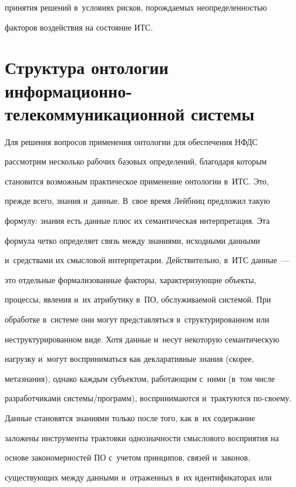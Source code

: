 принятия решений в~условиях рисков, порождаемых неопределенностью


факторов воздействия на состояние ИТС.





\section{Структура онтологии информационно-телекоммуникационной системы}





  Для решения вопросов применения онтологии для обеспечения НФДС


рассмотрим несколько рабочих базовых определений, благодаря которым


становится возможным практическое применение онтологии в~ИТС. Это,


прежде всего, знания и~данные. В~свое время Лейбниц предложил такую


формулу: знания есть данные плюс их семантическая интерпретация. Эта


формула четко определяет связь между знаниями, исходными данными


и~средствами их смысловой интерпретации. Действительно, в~ИТС данные~---


это отдельные формализованные факторы, характеризующие объекты,


процессы, явления и~их атрибутику в~ПО, обслуживаемой системой. При


обработке в~системе они могут представляться в~структурированном или


неструктурированном виде. Хотя данные и~несут некоторую семантическую


нагрузку и~могут восприниматься как декларативные знания (скорее,


метазнания), однако каждым субъектом, работающим с~ними (в~том числе


разработчиками системы/программ), воспринимаются и~трактуются по-своему.





  Данные становятся знаниями только после того, как в~их содержание


заложены инструменты трактовки однозначности смыслового восприятия на


основе закономерностей ПО с~учетом принципов, связей и~законов,


существующих между данными и~отраженных в~их идентификаторах или


